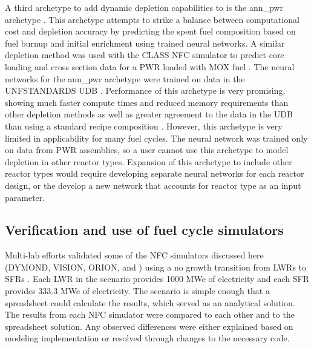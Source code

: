 A third archetype to add dynamic depletion capabilities to \Cyclus 
is the ann\_pwr archetype \cite{bae_deep_2020}. This archetype 
attempts to strike a balance between computational cost and 
depletion accuracy by predicting the spent fuel composition based on 
fuel burnup and initial enrichment using trained neural networks.
A similar depletion method was used with the \gls{CLASS} 
\gls{NFC} simulator to predict core loading and cross section data 
for a \gls{PWR} loaded with \gls{MOX} fuel \cite{leniau_neural_2015}.
The neural networks for the ann\_pwr archetype were trained 
on data in the \gls{UNFSTANDARDS} \gls{UDB} \cite{peterson_used_2013}.
Performance of this archetype is very promising, showing much faster 
compute times and reduced memory requirements than other depletion 
methods as well as greater agreement to the data in the \gls{UDB} than 
using a standard recipe composition \cite{bae_deep_2020}. However, 
this archetype is very limited in applicability for many fuel cycles. 
The neural network was trained only on data from \gls{PWR}
assemblies, so a user cannot use this archetype to model depletion 
in other reactor types. Expansion of this archetype to include 
other reactor types would require developing separate neural networks for 
each reactor design, or the develop a new network that accounts for 
reactor type as an input parameter. 

\subsection{Verification and use of fuel cycle simulators}
Multi-lab efforts validated some of the \gls{NFC} simulators discussed here 
(\gls{DYMOND}, \gls{VISION}, ORION, and \Cyclus)
using a no growth transition from \glspl{LWR} 
to \glspl{SFR} \cite{feng_standardized_2016,bae_standardized_2019}.
Each \gls{LWR} in the scenario provides 1000 MWe of 
electricity and each \gls{SFR} provides 333.3 MWe of electricity. The 
scenario is simple enough that a spreadsheet could calculate the results, 
which served as an analytical solution. The 
results from each \gls{NFC} simulator were compared to each other and 
to the spreadsheet solution. Any observed differences were either explained 
based on modeling implementation or resolved through changes to the 
necessary code.

